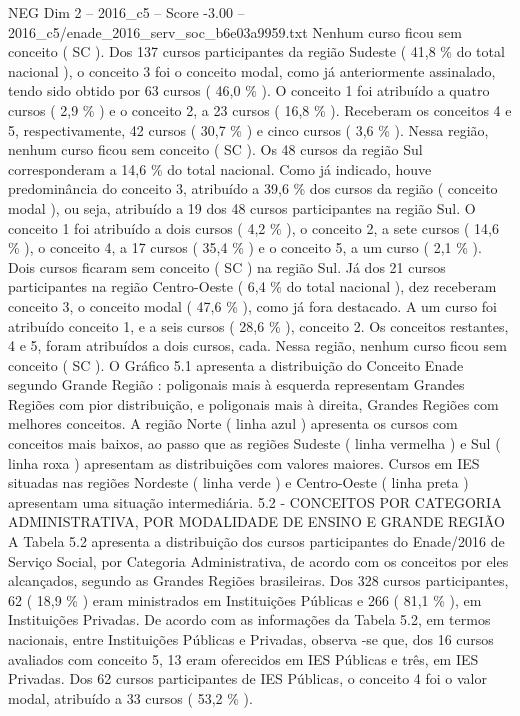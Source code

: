 \begin{textsample}{NEG Dim 2 – 2016\_c5 – Score -3.00 – 2016\_c5/enade\_2016\_serv\_soc\_b6e03a9959.txt}
Nenhum curso ficou sem conceito ( SC ).
Dos 137 cursos participantes da região Sudeste ( 41,8 \% do total nacional ), o conceito 3 foi o conceito modal, como já anteriormente assinalado, tendo sido obtido por 63 cursos ( 46,0 \% ).
O conceito 1 foi atribuído a quatro cursos ( 2,9 \% ) e o conceito 2, a 23 cursos ( 16,8 \% ).
Receberam os conceitos 4 e 5, respectivamente, 42 cursos ( 30,7 \% ) e cinco cursos ( 3,6 \% ).
Nessa região, nenhum curso ficou sem conceito ( SC ).
Os 48 cursos da região Sul corresponderam a 14,6 \% do total nacional.
Como já indicado, houve predominância do conceito 3, atribuído a 39,6 \% dos cursos da região ( conceito modal ), ou seja, atribuído a 19 dos 48 cursos participantes na região Sul.
O conceito 1 foi atribuído a dois cursos ( 4,2 \% ), o conceito 2, a sete cursos ( 14,6 \% ), o conceito 4, a 17 cursos ( 35,4 \% ) e o conceito 5, a um curso ( 2,1 \% ).
Dois cursos ficaram sem conceito ( SC ) na região Sul.
Já dos 21 cursos participantes na região Centro-Oeste ( 6,4 \% do total nacional ), dez receberam conceito 3, o conceito modal ( 47,6 \% ), como já fora destacado.
A um curso foi atribuído conceito 1, e a seis cursos ( 28,6 \% ), conceito 2.
Os conceitos restantes, 4 e 5, foram atribuídos a dois cursos, cada.
Nessa região, nenhum curso ficou sem conceito ( SC ).
O Gráfico 5.1 apresenta a distribuição do Conceito Enade segundo Grande Região : poligonais mais à esquerda representam Grandes Regiões com pior distribuição, e poligonais mais à direita, Grandes Regiões com melhores conceitos.
A região Norte ( linha azul ) apresenta os cursos com conceitos mais baixos, ao passo que as regiões Sudeste ( linha vermelha ) e Sul ( linha roxa ) apresentam as distribuições com valores maiores.
Cursos em IES situadas nas regiões Nordeste ( linha verde ) e Centro-Oeste ( linha preta ) apresentam uma situação intermediária. 5.2 - CONCEITOS POR CATEGORIA ADMINISTRATIVA, POR MODALIDADE DE ENSINO E GRANDE REGIÃO A Tabela 5.2 apresenta a distribuição dos cursos participantes do Enade/2016 de Serviço Social, por Categoria Administrativa, de acordo com os conceitos por eles alcançados, segundo as Grandes Regiões brasileiras.
Dos 328 cursos participantes, 62 ( 18,9 \% ) eram ministrados em Instituições Públicas e 266 ( 81,1 \% ), em Instituições Privadas.
De acordo com as informações da Tabela 5.2, em termos nacionais, entre Instituições Públicas e Privadas, observa -se que, dos 16 cursos avaliados com conceito 5, 13 eram oferecidos em IES Públicas e três, em IES Privadas.
Dos 62 cursos participantes de IES Públicas, o conceito 4 foi o valor modal, atribuído a 33 cursos ( 53,2 \% ).

\end{textsample}
